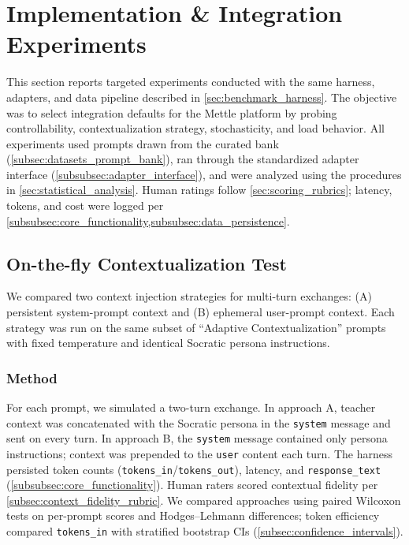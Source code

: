 \section{Implementation \& Integration Experiments}\label{sec:experiments}

This section reports targeted experiments conducted with the same harness, adapters, and data pipeline described in \cref{sec:benchmark_harness}. The objective was to select integration defaults for the Mettle platform by probing controllability, contextualization strategy, stochasticity, and load behavior. All experiments used prompts drawn from the curated bank (\cref{subsec:datasets_prompt_bank}), ran through the standardized adapter interface (\cref{subsubsec:adapter_interface}), and were analyzed using the procedures in \cref{sec:statistical_analysis}. Human ratings follow \cref{sec:scoring_rubrics}; latency, tokens, and cost were logged per \cref{subsubsec:core_functionality,subsubsec:data_persistence}.

\subsection{On-the-fly Contextualization Test}\label{subsec:contextualization_test}

We compared two context injection strategies for multi-turn exchanges: (A) persistent system-prompt context and (B) ephemeral user-prompt context. Each strategy was run on the same subset of ``Adaptive Contextualization'' prompts with fixed temperature and identical Socratic persona instructions.

\subsubsection{Method}\label{subsubsec:contextualization_method}

For each prompt, we simulated a two-turn exchange. In approach A, teacher context was concatenated with the Socratic persona in the \texttt{system} message and sent on every turn. In approach B, the \texttt{system} message contained only persona instructions; context was prepended to the \texttt{user} content each turn. The harness persisted token counts (\verb|tokens_in|/\verb|tokens_out|), latency, and \verb|response_text| (\cref{subsubsec:core_functionality}). Human raters scored contextual fidelity per \cref{subsec:context_fidelity_rubric}. We compared approaches using paired Wilcoxon tests on per-prompt scores and Hodges--Lehmann differences; token efficiency compared \verb|tokens_in| with stratified bootstrap CIs (\cref{subsec:confidence_intervals}).

